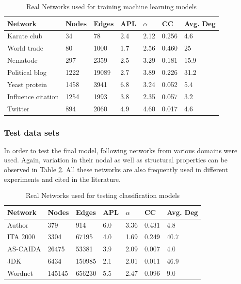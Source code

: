 			\begin{table}[h]
				\centering
				\begin{tabular}{|l|l|l|l|l|l|l|}
					\hline
					\textbf{Network} & \textbf{Nodes} & \textbf{Edges} & \textbf{APL} & \textbf{$\alpha$} & \textbf{CC} & \textbf{Avg. Deg} \\ \hline
					Karate club        & 34   & 78    & 2.4 & 2.12 & 0.256 & 4.6  \\ \hline
					World trade        & 80   & 1000  & 1.7 & 2.56 & 0.460 & 25   \\ \hline
					Nematode           & 297  & 2359  & 2.5 & 3.29 & 0.181 & 15.9 \\ \hline
					Political blog     & 1222 & 19089 & 2.7 & 3.89 & 0.226 & 31.2  \\ \hline
					Yeast protein      & 1458 & 3941  & 6.8 & 3.24 & 0.052 & 5.4 \\ \hline
					Influence citation & 1254 & 1993  & 3.8 & 2.35 & 0.057 & 3.2  \\ \hline
					Twitter            & 894  & 2060  & 4.9 & 4.60 & 0.017 & 4.6  \\ \hline
				\end{tabular}%
				\caption{Real Networks used for training machine learning models}
				\label{tab:inf-max-machine-learning-training-graphs}
			\end{table}
			
			\subsubsection{Test data sets}
			In order to test the final model, following networks from various domains were used. Again, variation in their nodal as well as structural properties can be observed in Table \ref{tab:inf-max-machine-learning-test-graphs}. All these networks are also frequently used in different experiments and cited in the literature.
			
			\begin{table}[h]
				\centering
				\begin{tabular}{|l|l|l|l|l|l|l|}
					\hline
					\textbf{Network} & \textbf{Nodes} & \textbf{Edges} & \textbf{APL} & \textbf{$\alpha$} & \textbf{CC} & \textbf{Avg. Deg} \\ \hline
					Author   & 379    & 914    & 6.0 & 3.36 & 0.431 & 4.8  \\ \hline
					ITA 2000 & 3304   & 67195  & 4.0 & 1.69 & 0.249 & 40.7 \\ \hline
					AS-CAIDA & 26475  & 53381  & 3.9 & 2.09 & 0.007 & 4.0  \\ \hline
					JDK      & 6434   & 150985 & 2.1 & 2.01 & 0.011 & 46.9 \\ \hline
					Wordnet  & 145145 & 656230 & 5.5 & 2.47 & 0.096 & 9.0  \\ \hline
				\end{tabular}
				\caption{Real Networks used for testing classification models}
				\label{tab:inf-max-machine-learning-test-graphs}
			\end{table}
			
